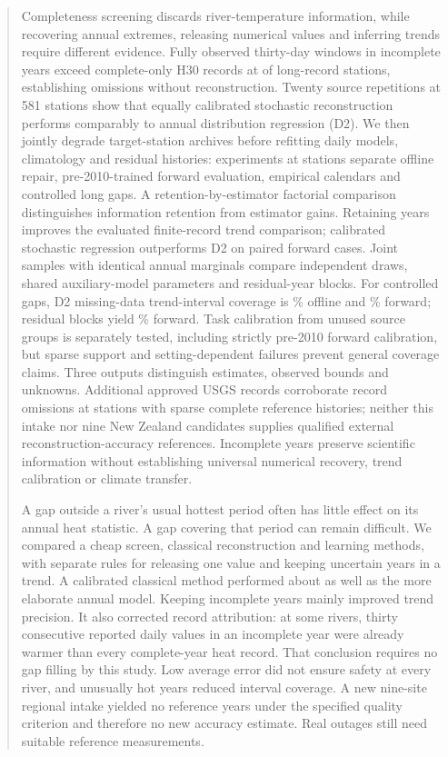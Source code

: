 \documentclass[draft,linenumbers]{agujournal2025}
\begin{document}
\begin{abstract}
Completeness screening discards river-temperature information, while recovering annual extremes, releasing numerical values and inferring trends require different evidence. Fully observed thirty-day windows in incomplete years exceed complete-only H30 records at \RRecordStations{} of \RRecordDenominator{} long-record stations, establishing omissions without reconstruction. Twenty source repetitions at 581 stations show that equally calibrated stochastic reconstruction performs comparably to annual distribution regression (D2). We then jointly degrade target-station archives before refitting daily models, climatology and residual histories: \WARepetitions{} experiments at \WAStations{} stations separate offline repair, pre-2010-trained forward evaluation, empirical calendars and controlled long gaps. A retention-by-estimator factorial comparison distinguishes information retention from estimator gains. Retaining years improves the evaluated finite-record trend comparison; calibrated stochastic regression outperforms D2 on paired forward cases. Joint samples with identical annual marginals compare independent draws, shared auxiliary-model parameters and residual-year blocks. For controlled gaps, D2 missing-data trend-interval coverage is \WAOfflineCoverage\% offline and \WAForwardCoverage\% forward; residual blocks yield \WABlockForwardCoverage\% forward. Task calibration from unused source groups is separately tested, including strictly pre-2010 forward calibration, but sparse support and setting-dependent failures prevent general coverage claims. Three outputs distinguish estimates, observed bounds and unknowns. Additional approved USGS records corroborate \WAAdditionalYears{} record omissions at \WAAdditionalStations{} stations with sparse complete reference histories; neither this intake nor nine New Zealand candidates supplies qualified external reconstruction-accuracy references. Incomplete years preserve scientific information without establishing universal numerical recovery, trend calibration or climate transfer.
\begin{plainlanguagesummary}
A gap outside a river's usual hottest period often has little effect on its annual heat statistic. A gap covering that period can remain difficult. We compared a cheap screen, classical reconstruction and learning methods, with separate rules for releasing one value and keeping uncertain years in a trend. A calibrated classical method performed about as well as the more elaborate annual model. Keeping incomplete years mainly improved trend precision. It also corrected record attribution: at some rivers, thirty consecutive reported daily values in an incomplete year were already warmer than every complete-year heat record. That conclusion requires no gap filling by this study. Low average error did not ensure safety at every river, and unusually hot years reduced interval coverage. A new nine-site regional intake yielded no reference years under the specified quality criterion and therefore no new accuracy estimate. Real outages still need suitable reference measurements.
\end{plainlanguagesummary}
\end{abstract}
\end{document}

